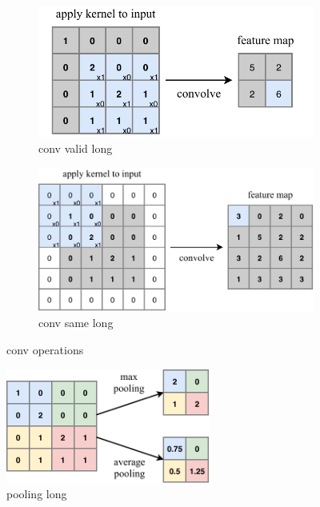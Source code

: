 \begin{figure} %
    \centering
    \begin{subfigure}[b]{0.71\textwidth}
        \centering
        \includegraphics[width=\textwidth]{diagrams/7-cvn/conv_valid.pdf}
        \caption{conv valid long}
        \label{fig:conv_valid}
    \end{subfigure}
    \hfill
    \begin{subfigure}[b]{0.9\textwidth}
        \centering
        \includegraphics[width=\textwidth]{diagrams/7-cvn/conv_same.pdf}
        \caption{conv same long}
        \label{fig:conv_same}
    \end{subfigure}
    \caption{conv operations}
    \label{fig:conv_operations}
\end{figure}

\begin{figure} %
    \includegraphics[width=0.6\textwidth]{diagrams/7-cvn/pooling.pdf}
    \caption[pooling short]
    {pooling long}
    \label{fig:pooling}
\end{figure}

